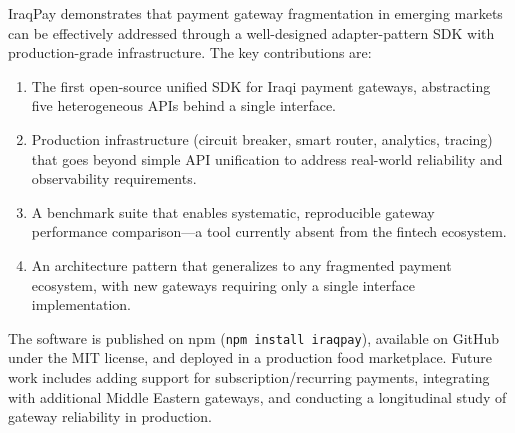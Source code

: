 \documentclass[preprint,12pt]{elsarticle}
\begin{document}
IraqPay demonstrates that payment gateway fragmentation in emerging markets can be effectively addressed through a well-designed adapter-pattern SDK with production-grade infrastructure. The key contributions are:

\begin{enumerate}
\item The first open-source unified SDK for Iraqi payment gateways, abstracting five heterogeneous APIs behind a single interface.
\item Production infrastructure (circuit breaker, smart router, analytics, tracing) that goes beyond simple API unification to address real-world reliability and observability requirements.
\item A benchmark suite that enables systematic, reproducible gateway performance comparison---a tool currently absent from the fintech ecosystem.
\item An architecture pattern that generalizes to any fragmented payment ecosystem, with new gateways requiring only a single interface implementation.
\end{enumerate}

The software is published on npm (\texttt{npm install iraqpay}), available on GitHub under the MIT license, and deployed in a production food marketplace. Future work includes adding support for subscription/recurring payments, integrating with additional Middle Eastern gateways, and conducting a longitudinal study of gateway reliability in production.

\end{document}
